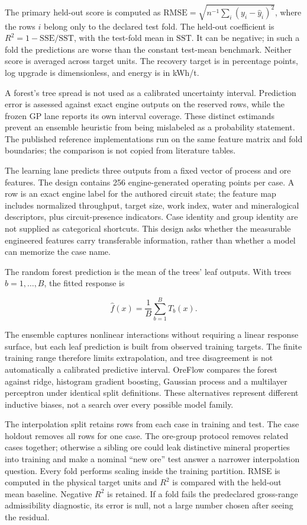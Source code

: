 \documentclass[10pt]{article}
\begin{document}
The primary held-out score is computed as
\(\mathrm{RMSE}=\sqrt{n^{-1}\sum_i(y_i-\hat y_i)^2}\), where the rows
\(i\) belong only to the declared test fold. The held-out coefficient is
\(R^2=1-\mathrm{SSE}/\mathrm{SST}\), with the test-fold mean in
\(\mathrm{SST}\). It can be negative; in such a fold the predictions are
worse than the constant test-mean benchmark. Neither score is averaged
across target units. The recovery target is in percentage points, log
upgrade is dimensionless, and energy is in kWh/t.

A forest's tree spread is not used as a calibrated uncertainty interval.
Prediction error is assessed against exact engine outputs on the
reserved rows, while the frozen GP lane reports its own interval
coverage. These distinct estimands prevent an ensemble heuristic from
being mislabeled as a probability statement. The published reference
implementations run on the same feature matrix and fold boundaries; the
comparison is not copied from literature tables.

The learning lane predicts three outputs from a fixed vector of process
and ore features. The design contains 256 engine-generated operating
points per case. A row is an exact engine label for the authored circuit
state; the feature map includes normalized throughput, target size, work
index, water and mineralogical descriptors, plus circuit-presence
indicators. Case identity and group identity are not supplied as
categorical shortcuts. This design asks whether the measurable
engineered features carry transferable information, rather than whether
a model can memorize the case name.

The random forest prediction is the mean of the trees' leaf outputs.
With trees \(b=1,\dots,B\), the fitted response is

\[\hat f(x)=\frac{1}{B}\sum_{b=1}^{B}T_b(x).\]

The ensemble captures nonlinear interactions without requiring a linear
response surface, but each leaf prediction is built from observed
training targets. The finite training range therefore limits
extrapolation, and tree disagreement is not automatically a calibrated
predictive interval. OreFlow compares the forest against ridge,
histogram gradient boosting, Gaussian process and a multilayer
perceptron under identical split definitions. These alternatives
represent different inductive biases, not a search over every possible
model family.

The interpolation split retains rows from each case in training and
test. The case holdout removes all rows for one case. The ore-group
protocol removes related cases together; otherwise a sibling ore could
leak distinctive mineral properties into training and make a nominal
``new ore'' test answer a narrower interpolation question. Every fold
performs scaling inside the training partition. RMSE is computed in the
physical target units and \(R^2\) is compared with the held-out mean
baseline. Negative \(R^2\) is retained. If a fold fails the predeclared
gross-range admissibility diagnostic, its error is null, not a large
number chosen after seeing the residual.
\end{document}

